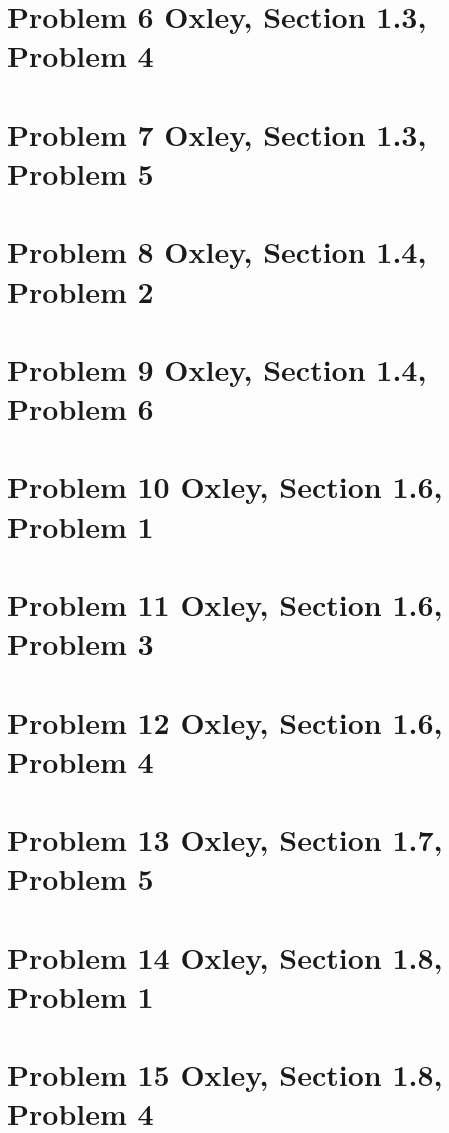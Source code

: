     \section{Problem 6 Oxley, Section 1.3, Problem 4}
        

    \section{Problem 7 Oxley, Section 1.3, Problem 5}
        

    \section{Problem 8 Oxley, Section 1.4, Problem 2}
        

    \section{Problem 9 Oxley, Section 1.4, Problem 6}
        

    \section{Problem 10 Oxley, Section 1.6, Problem 1}
        

    \section{Problem 11 Oxley, Section 1.6, Problem 3}
        

    \section{Problem 12 Oxley, Section 1.6, Problem 4}
        

    \section{Problem 13 Oxley, Section 1.7, Problem 5}
        

    \section{Problem 14 Oxley, Section 1.8, Problem 1}
        

    \section{Problem 15 Oxley, Section 1.8, Problem 4}
           